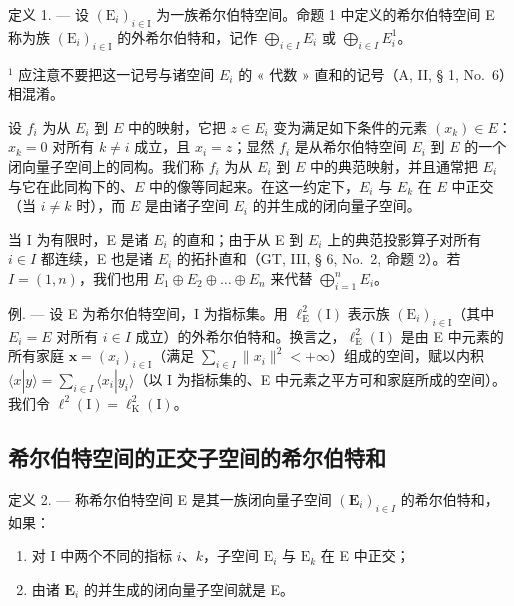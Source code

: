 定义 1. --- 设 \((\mathrm{E}_{i})_{i\in\mathrm{I}}\) 为一族希尔伯特空间。命题 1 中定义的希尔伯特空间 E 称为族 \((\mathrm{E}_{i})_{i\in\mathrm{I}}\) 的外希尔伯特和，记作 \(\bigoplus_{i\in I} E_{i}\) 或 \(\bigoplus_{i\in I} E_{i}^{1}\)。

\(^{1}\) 应注意不要把这一记号与诸空间 \(E_{i}\) 的 « 代数 » 直和的记号（A, II, § 1, No.~6）相混淆。

设 \(f_{i}\) 为从 \(E_{i}\) 到 \(E\) 中的映射，它把 \(z \in E_{i}\) 变为满足如下条件的元素 \((x_{k}) \in E\)：\(x_{k} = 0\) 对所有 \(k \neq i\) 成立，且 \(x_{i} = z\)；显然 \(f_{i}\) 是从希尔伯特空间 \(E_{i}\) 到 \(E\) 的一个闭向量子空间上的同构。我们称 \(f_{i}\) 为从 \(E_{i}\) 到 \(E\) 中的典范映射，并且通常把 \(E_{i}\) 与它在此同构下的、\(E\) 中的像等同起来。在这一约定下，\(E_{i}\) 与 \(E_{k}\) 在 \(E\) 中正交（当 \(i \neq k\) 时），而 \(E\) 是由诸子空间 \(E_{i}\) 的并生成的闭向量子空间。

当 I 为有限时，E 是诸 \(E_{i}\) 的直和；由于从 E 到 \(E_{i}\) 上的典范投影算子对所有 \(i \in I\) 都连续，E 也是诸 \(E_{i}\) 的拓扑直和（GT, III, § 6, No.~2, 命题 2）。若 \(I = \left(1, n\right)\)，我们也用 \(E_{1} \oplus E_{2} \oplus \ldots \oplus E_{n}\) 来代替 \(\bigoplus_{i=1}^{n} E_{i}\)。

例. --- 设 E 为希尔伯特空间，I 为指标集。用 \(\ell_{\mathrm{E}}^{2}(\mathrm{I})\) 表示族 \((\mathrm{E}_{i})_{i\in\mathrm{I}}\)（其中 \(E_{i}=E\) 对所有 \(i\in I\) 成立）的外希尔伯特和。换言之，\(\ell_{\mathrm{E}}^{2}(\mathrm{I})\) 是由 E 中元素的所有家庭 \(\mathbf{x}=(x_{i})_{i\in\mathrm{I}}\)（满足 \(\sum_{i\in I}\|x_{i}\|^{2}<+\infty\)）组成的空间，赋以内积 \(\langle x|y\rangle=\sum_{i\in I}\langle x_{i}|y_{i}\rangle\)（以 I 为指标集的、E 中元素之平方可和家庭所成的空间）。我们令 \(\ell^{2}(\mathrm{I})=\ell_{\mathrm{K}}^{2}(\mathrm{I})\)。

\subsection{希尔伯特空间的正交子空间的希尔伯特和}

定义 2. --- 称希尔伯特空间 E 是其一族闭向量子空间 \((\mathbf{E}_{i})_{i\in I}\) 的希尔伯特和，如果：

\begin{enumerate}
\def\labelenumi{\arabic{enumi})}
\item
  对 I 中两个不同的指标 \(i\)、\(k\)，子空间 \(\mathrm{E}_i\) 与 \(\mathrm{E}_k\) 在 E 中正交；
\item
  由诸 \(\mathbf{E}_i\) 的并生成的闭向量子空间就是 E。
\end{enumerate}

